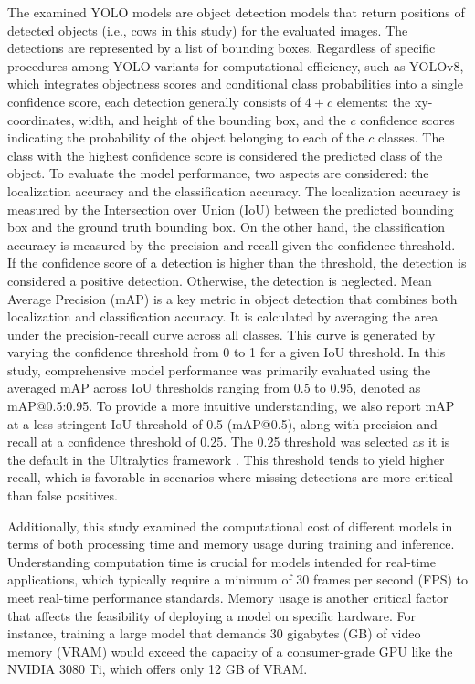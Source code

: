The examined YOLO models are object detection models that return positions of detected objects (i.e., cows in this study) for the evaluated images. The detections are represented by a list of bounding boxes. Regardless of specific procedures among YOLO variants for computational efficiency, such as YOLOv8, which integrates objectness scores and conditional class probabilities into a single confidence score, each detection generally consists of $4+c$ elements: the xy-coordinates, width, and height of the bounding box, and the $c$ confidence scores indicating the probability of the object belonging to each of the $c$ classes. The class with the highest confidence score is considered the predicted class of the object. To evaluate the model performance, two aspects are considered: the localization accuracy and the classification accuracy. The localization accuracy is measured by the Intersection over Union (IoU) between the predicted bounding box and the ground truth bounding box. On the other hand, the classification accuracy is measured by the precision and recall given the confidence threshold. If the confidence score of a detection is higher than the threshold, the detection is considered a positive detection. Otherwise, the detection is neglected. Mean Average Precision (mAP) is a key metric in object detection that combines both localization and classification accuracy. It is calculated by averaging the area under the precision-recall curve across all classes. This curve is generated by varying the confidence threshold from 0 to 1 for a given IoU threshold. In this study, comprehensive model performance was primarily evaluated using the averaged mAP across IoU thresholds ranging from 0.5 to 0.95, denoted as mAP@0.5:0.95. To provide a more intuitive understanding, we also report mAP at a less stringent IoU threshold of 0.5 (mAP@0.5), along with precision and recall at a confidence threshold of 0.25. The 0.25 threshold was selected as it is the default in the Ultralytics framework \citep{ultralytics_yolo}. This threshold tends to yield higher recall, which is favorable in scenarios where missing detections are more critical than false positives.

Additionally, this study examined the computational cost of different models in terms of both processing time and memory usage during training and inference. Understanding computation time is crucial for models intended for real-time applications, which typically require a minimum of 30 frames per second (FPS) to meet real-time performance standards. Memory usage is another critical factor that affects the feasibility of deploying a model on specific hardware. For instance, training a large model that demands 30 gigabytes (GB) of video memory (VRAM) would exceed the capacity of a consumer-grade GPU like the NVIDIA 3080 Ti, which offers only 12 GB of VRAM.

